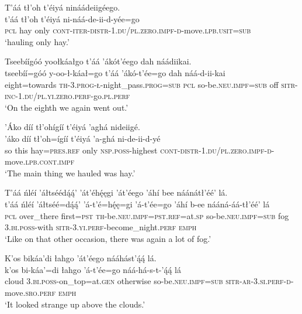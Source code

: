 \ea\label{ex:text9-8-4}
T’áá tł’oh t’éiyá nináádeiigéego.\\
\gll t’áá	tł’oh	t’éiyá	ni-náá-de-ii-d-yée=go\\
     \textsc{pcl}	hay	only	\textsc{cont}-\textsc{iter}-\textsc{distr}-1.\textsc{du}/\textsc{pl}.\textsc{zero}.\textsc{impf}-\textsc{d}-move.\textsc{lpb}.\textsc{usit}=\textsc{sub}\\
\glt `hauling only hay.'
\z

\ea\label{ex:text9-9-1}
Tseebíígóó yoołkáałgo t’áá ’ákót’éego dah náádiikai.\\
\gll tseebíí=góó	y-oo-ł-káał=go	t’áá	’ákó-t’ée=go	dah	náá-d-ii-kai\\
     eight=towards	\textsc{th}-3.\textsc{prog}-\textsc{ł}-night\_pass.\textsc{prog}=\textsc{sub}	\textsc{pcl}	so-be.\textsc{neu}.\textsc{impf}=\textsc{sub}	off	\textsc{sitr}-\textsc{inc}-1.\textsc{du}/\textsc{pl}.\textsc{yi}.\textsc{zero}.\textsc{perf}-go.\textsc{pl}.\textsc{perf}\\
\glt `On the eighth we again went out.'
\z

\ea\label{ex:text9-9-2}
’Áko díí tł’ohígíí t’éiyá ’aghá nideiigé.\\
\gll ’áko	díí	tł’oh=ígíí	t’éiyá	’a-ghá	ni-de-ii-d-yé\\
     so	this	hay=\textsc{pres}.\textsc{ref}	only	\textsc{nsp}.\textsc{poss}-highest	\textsc{cont}-\textsc{distr}-1.\textsc{du}/\textsc{pl}.\textsc{zero}.\textsc{impf}-\textsc{d}-move.\textsc{lpb}.\textsc{cont}.\textsc{impf}\\
\glt `The main thing we hauled was hay.'
\z

\ea\label{ex:text9-9-3}
T’áá ńléí ’áłtséédą́ą́’ ’át’éhę́ęgi ’át’éego ’áhí bee náánátł’éé’ lá.\\
\gll t’áá	ńléí	’áłtséé=dą́ą́’	’á-t’é=hę́ę=gi	’á-t’ée=go	’áhí	b-ee	nááná-áá-tł’éé’	lá\\
     \textsc{pcl}	over\_there	first=\textsc{pst}	\textsc{th}-be.\textsc{neu}.\textsc{impf}=\textsc{pst}.\textsc{ref}=at.\textsc{sp}	so-be.\textsc{neu}.\textsc{impf}=\textsc{sub}	fog	3.\textsc{bi}.\textsc{poss}-with	\textsc{sitr}-3.\textsc{yi}.\textsc{perf}-become\_night.\textsc{perf}	\textsc{emph}\\
\glt `Like on that other occasion, there was again a lot of fog.'
\z

\ea\label{ex:text9-9-4}
K’os bikáa’di łahgo ’át’éego nááhást’ą́ą́ lá.\\
\gll k’os	bi-káa’=di	łahgo	’á-t’ée=go	náá-há-s-t-’ą́ą́	lá\\
     cloud	3.\textsc{bi}.\textsc{poss}-on\_top=at.\textsc{gen}	otherwise	so-be.\textsc{neu}.\textsc{impf}=\textsc{sub}	\textsc{sitr}-\textsc{ar}-3.\textsc{si}.\textsc{perf}-\textsc{d}-move.\textsc{sro}.\textsc{perf}	\textsc{emph}\\
\glt `It looked strange up above the clouds.'
\z

